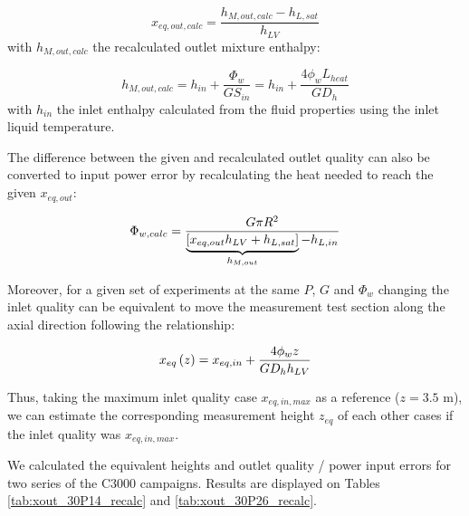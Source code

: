 \begin{equation}
x_{eq,out,calc} = \frac{h_{M,out,calc} - h_{L,sat}}{h_{LV}}
\label{eq:xeq_out}
\end{equation}
with $h_{M,out,calc}$ the recalculated outlet mixture enthalpy:

\begin{equation}
h_{M,out,calc} = h_{in} + \frac{\Phi_{w}}{G S_{in}} = h_{in} + \frac{4\phi_{w}L_{heat}}{G D_{h}}
\end{equation}
with $h_{in}$ the inlet enthalpy calculated from the fluid properties using the inlet liquid temperature.

\npar
The difference between the given and recalculated outlet quality can also be converted to input power error by recalculating the heat needed to reach the given $x_{eq,out}$:

\begin{equation}
\Phi_{w,calc} = \frac{G  \pi R^{2}}{\underbrace{\left[ x_{eq,out}h_{LV}+h_{L,sat} \right]}_{h_{M,out}} - h_{L,in}}
\end{equation}

\npar 


Moreover, for a given set of experiments at the same $P$, $G$ and $\Phi_{w}$ changing the inlet quality can be equivalent to move the measurement test section along the axial direction following the relationship: 

\begin{equation}
x_{eq}\left( z \right) = x_{eq,in} + \frac{4 \phi_{w} z }{G D_{h} h_{LV}}
\end{equation}

Thus, taking the maximum inlet quality case $x_{eq,in, max}$ as a reference ($z=3.5$ m), we can estimate the corresponding measurement height $z_{eq}$ of each other cases if the inlet quality was $x_{eq,in, max}$.

\npar

We calculated the equivalent heights and outlet quality / power input errors for two series of the C3000 campaigns. Results are displayed on Tables \ref{tab:xout_30P14_recalc} and \ref{tab:xout_30P26_recalc}.



